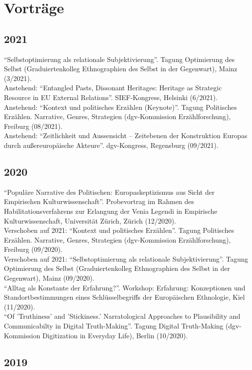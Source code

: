 \section*{Vorträge}
\subsection*{2021}
\enquote{Selbstoptimierung als relationale Subjektivierung}. Tagung Optimierung des Selbst (Graduiertenkolleg Ethnographien des Selbst in der Gegenwart), Mainz (3/2021).\\[.25cm]Anstehend: \enquote{Entangled Pasts, Dissonant Heritages: Heritage as Strategic Resource in EU External Relations}. SIEF-Kongress, Helsinki (6/2021).\\[.25cm]Anstehend: \enquote{Kontext und politisches Erzählen (Keynote)}. Tagung Politisches Erzählen. Narrative, Genres, Strategien (dgv-Kommission Erzählforschung), Freiburg (08/2021).\\[.25cm]Anstehend: \enquote{Zeitlichkeit und Aussensicht – Zeitebenen der Konstruktion Europas durch außereuropäische Akteure}. dgv-Kongress, Regensburg (09/2021).\subsection*{2020}
\enquote{Populäre Narrative des Politischen: Europaskeptizismus aus Sicht der Empirischen Kulturwissenschaft}. Probevortrag im Rahmen des Habilitationsverfahrens zur Erlangung der Venia Legendi in Empirische Kulturwissenschaft, Universität Zürich, Zürich (12/2020).\\[.25cm]Verschoben auf 2021: \enquote{Kontext und politisches Erzählen}. Tagung Politisches Erzählen. Narrative, Genres, Strategien (dgv-Kommission Erzählforschung), Freiburg (09/2020).\\[.25cm]Verschoben auf 2021: \enquote{Selbstoptimierung als relationale Subjektivierung}. Tagung Optimierung des Selbst (Graduiertenkolleg Ethnographien des Selbst in der Gegenwart), Mainz (09/2020).\\[.25cm]\enquote{Alltag als Konstante der Erfahrung?}. Workshop: Erfahrung: Konzeptionen und Standortbestimmungen eines Schlüsselbegriffs der Europäischen Ethnologie, Kiel (11/2020).\\[.25cm]\enquote{Of 'Truthiness' and 'Stickiness.' Narratological Approaches to Plausibility and Communicabilty in Digital Truth-Making}. Tagung Digital Truth-Making (dgv-Kommission Digitization in Everyday Life), Berlin (10/2020).\subsection*{2019}
